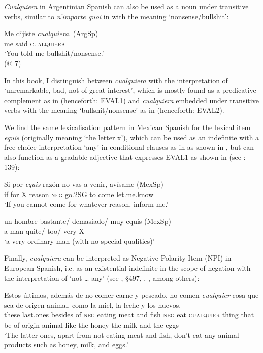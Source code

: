 \textit{Cualquiera} in Argentinian Spanish can also be used as a noun under transitive verbs, similar to \textit{n’importe quoi} in  with the meaning ‘nonsense/bullshit’:

\ea \label{ex:key:13}
    \gll Me dijiste \textit{cualquiera}. (ArgSp)\\
    me said \textsc{cualquiera}\\
    \glt ‘You told me bullshit/nonsense.’\\
    (@ 7)
\z

In this book, I distinguish between \textit{cualquiera} with the interpretation of ‘unremarkable, bad, not of great interest’, which is mostly found as a predicative complement as in  (henceforth: EVAL1) and \textit{cualquiera} embedded under transitive verbs with the meaning ‘bullshit/nonsense’ as in  (henceforth: EVAL2).

We find the same lexicalisation pattern in Mexican Spanish for the lexical item \textit{equis} (originally meaning ‘the letter x’), which can be used as an indefinite with a free choice interpretation ‘any’ in conditional clauses as in  as shown in \citet[137]{Kellert2020semantic}, but can also function as a gradable adjective that expresses EVAL1 as shown in  (see \citealt{Kellert2020semantic}: 139):

\ea \label{ex:key:14}
    \gll Si por \textit{equis} razón no vas a venir, avísame  \hfill (MexSp)\\
if for X reason \textsc{neg} go.\textsc{2SG} to come let.me.know\\
    \glt ‘If you cannot come for whatever reason, inform me.’

    \citep[137]{Kellert2020semantic}
\z

\ea \label{ex:key:15}
    \gll un hombre bastante/ demasiado/ muy equis  \hfill (MexSp)\\
a man quite/ too/ very X\\
    \glt ‘a very ordinary man (with no special qualities)’

    \citep[138]{Kellert2020semantic}
\z

Finally, \textit{cualquiera} can be interpreted as Negative Polarity Item (NPI) in European Spanish, i.e. as an existential indefinite in the scope of negation with the interpretation of ‘not … any’ (see \citealt{DeBruyne2011}, §497, \citealt{Arregui2006}, \citealt{Chierchia2006}, among others):

\ea \label{ex:key:16}
    \gll Estos últimos, además de no comer carne y pescado, no comen \textit{cualquier} cosa que sea de origen animal, como la miel, la leche y los huevos.\\
these last.ones besides of \textsc{neg} eating meat and fish \textsc{neg} eat \textsc{cualquier} thing that be of origin animal like the honey the milk and the eggs\\
    \glt ‘The latter ones, apart from not eating meat and fish, don’t eat any animal products such as honey, milk, and eggs.’

